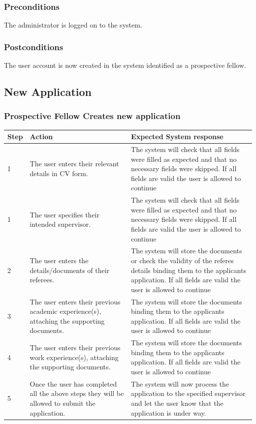 \documentclass[12pt]{article}
\begin{document}
\subsubsection*{Preconditions}
The administrator is logged on to the system.

\subsubsection*{Postconditions}
The user account is now created in the system identified as a prospective fellow.

\subsection{New Application}

\subsubsection{Prospective Fellow Creates new application}

\begin{center}
\begin{tabular}{|l|p{6cm}|p{8cm}|}
\hline
Step & Action & Expected System response \\
\hline
1 & The user enters their relevant details in CV form.  & The system will check that all fields were filled as expected and that no necessary fields were skipped. If all fields are valid the user is allowed to continue \\
\hline
1 & The user specifies their intended supervisor.  & The system will check that all fields were filled as expected and that no necessary fields were skipped. If all fields are valid the user is allowed to continue \\
\hline
2 & The user enters the details/documents of their referees.  & The system will store the documents or check the validity of the referes details binding them to the applicants application. If all fields are valid the user is allowed to continue \\
\hline
3 & The user enters their previous academic experience(s), attaching the supporting documents.  & The system will store the documents binding them to the applicants application. If all fields are valid the user is allowed to continue \\
\hline
4 & The user enters their previous work experience(s), attaching the supporting documents.  & The system will store the documents binding them to the applicants application. If all fields are valid the user is allowed to continue \\
5 & Once the user has completed all the above steps they will be allowed to submit the application.  & The system will now process the application to the specified supervisor and let the user know that the application is under way. \\
\hline
\end{tabular}
\end{center}
\end{document}
